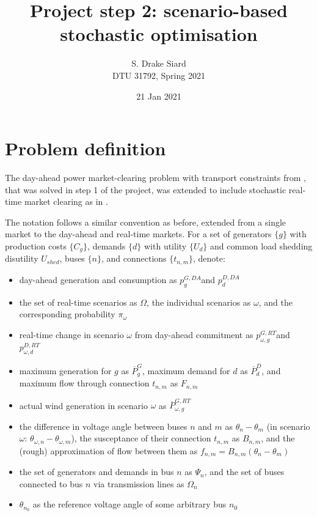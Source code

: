 \documentclass[11pt,a4paper]{article}
\title{\textbf{Project step 2: scenario-based stochastic optimisation}}
\author{S. Drake Siard\\
DTU 31792, Spring 2021}
\date{21 Jan 2021}
\numberwithin{equation}{section}
\begin{document}
\newcommand{\pd}{\ensuremath{p^{D,DA}_d}}
\newcommand{\pdrt}{\ensuremath{p^{D,RT}_{\omega,d}}}
\newcommand{\ud}{\ensuremath{U_d}}
\newcommand{\ushed}{\ensuremath{U_{shed}}}
\newcommand{\pg}{\ensuremath{p^{G,DA}_g}}
\newcommand{\pgrt}{\ensuremath{p^{G,RT}_{\omega,g}}}
\newcommand{\pgspill}{\ensuremath{p^{spill}_{\omega,g}}}
\newcommand{\cg}{\ensuremath{C_g}}
\newcommand{\bnm}{\ensuremath{B_{n,m}}}
\newcommand{\tnm}{\ensuremath{t_{n,m}}}
\newcommand{\fnm}{\ensuremath{f_{n,m}}}
\newcommand{\fnmw}{\ensuremath{f_{\omega,n,m}}}
\newcommand{\FNM}{\ensuremath{F_{n,m}}}
\newcommand{\PG}{\ensuremath{\overline{P}^G_g}}
\newcommand{\PGw}{\ensuremath{\overline{P}^{G,RT}_{\omega,g}}}
\newcommand{\PD}{\ensuremath{\overline{P}^D_d}}
\newcommand{\pw}{\ensuremath{\pi_\omega}}

\maketitle

\section{Problem definition}
\label{sec:problem}
The day-ahead power market-clearing problem with transport constraints from \cite{kazempourLectureMarketClearing2021}, that was solved in step 1 of the project, was extended to include stochastic real-time market clearing as in \cite{kazempourLectureStochasticMarket2021}.

The notation follows a similar convention as before, extended from a single market to the day-ahead and real-time markets.
For a set of generators $\{g\}$ with production costs $\{\cg\}$, demands $\{d\}$ with utility $\{\ud\}$ and common load shedding disutility $\ushed$, buses $\{n\}$, and connections $\{\tnm\}$, denote:
 \begin{itemize}
\item day-ahead generation and consumption as \pg and \pd
\item the set of real-time scenarios as $\Omega$, the individual scenarios as $\omega$, and the corresponding probability $\pw$
\item real-time change in scenario $\omega$ from day-ahead commitment as \pgrt and \pdrt
\item maximum generation for $g$ as $\PG$, maximum demand for $d$ as $\PD$, and maximum flow through connection $\tnm$ as $\FNM$
\item actual wind generation in scenario $\omega$ as $\PGw$
\item the difference in voltage angle between buses $n$ and $m$ as $\theta_n - \theta_m$ (in scenario $\omega$: $\theta_{\omega,n}-\theta_{\omega,m}$), the susceptance of their connection $\tnm$ as $\bnm$, and the (rough) approximation of flow between them as $\fnm = \bnm(\theta_n - \theta_m)$
\item the set of generators and demands in bus $n$ as $\Psi_n$, and the set of buses connected to bus $n$ via transmission lines as $\Omega_n$
\item $\theta_{n_0}$ as the reference voltage angle of some arbitrary bus $n_0$
\end{itemize}
\end{document}
